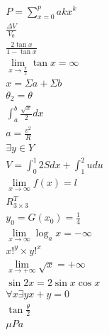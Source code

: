 \documentclass{article}
\begin{document}
\begin{align}
	P=\sum_{x=0}^{p}akx^{k}\\
	\frac{\Delta V}{V_{0}}\\
	\frac{2\tan x}{1-\tan x}\\
	\lim_{x\rightarrow \frac{\pi}{2}} \tan x= \infty\\
	x=\Sigma a+\Sigma b\\
	\theta_{2}=\theta\\
	\int_{a}^{b}\frac{\sqrt{x}}{2}dx\\
	a=\frac{v^{2}}{R}\\
	\exists y\in Y\\
	V=\int_{0}^{1}2Sdx+\int_{1}^{2}udu\\
	\lim_{x\rightarrow\infty}f(x)=l\\
	R_{3\times3}^{T}\\
	y_{0}=G(x_{0})=\frac{1}{4}\\
	\lim_{x\rightarrow\infty}\log_{a}x=-\infty\\
	x!^{y}\times y!^{x}\\ 
	\lim_{x\rightarrow+\infty}\sqrt{x}=+\infty\\
	\sin2x=2\sin x\cos x\\ 
	\forall x\exists y x+y=0\\
	\tan\frac{\theta}{2}\\
	\mu Pa
\end{align}
\end{document}
